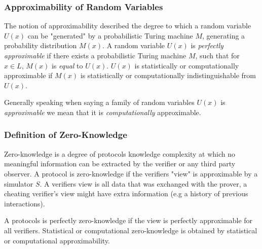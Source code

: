 \subsubsection{Approximability of Random Variables}%

The notion of approximability described the degree to which a random variable $U(x)$ can be "generated" by a probabilistic Turing machine $M$, generating a probability distribution $M(x)$.
\bigskip
\newline
A random variable $U(x)$ is \textit{perfectly approximable} if there exists a probabilistic Turing machine $M$, such that for $x \in L$, $M(x)$ is \textit{equal} to $U(x)$.
\newline
$U(x)$ is statistically or computationally approximable if $M(x)$ is statistically or computationally indistinguishable from $U(x)$.

\bigskip

Generally speaking when saying a family of random variables $U(x)$ is \textit{approximable} we mean that it is \textit{computationally} approximable.

\subsubsection{Definition of Zero-Knowledge}

Zero-knowledge is a degree of protocols knowledge complexity at which no meaningful information can be extracted by the verifier or any third party observer.
\bigskip
\newline
A protocol is zero-knowledge if the verifiers "view" is approximable by a simulator $S$.
A verifiers view is all data that was exchanged with the prover, a cheating verifier's view might have extra information (e.g a history of previous interactions).

A protocols is perfectly zero-knowledge if the view is perfectly approximable for all verifiers.
Statistical or computational zero-knowledge is obtained by statistical or computational approximability.